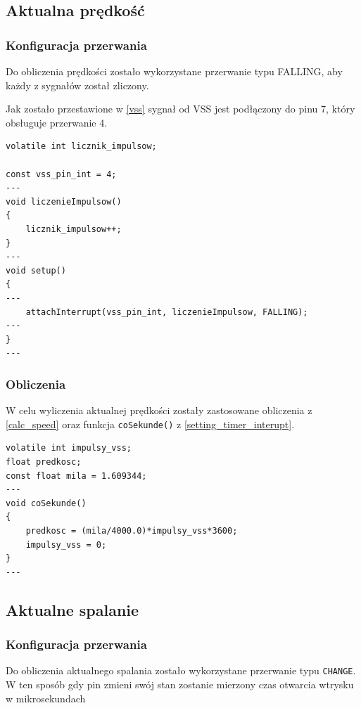 \subsection{Aktualna prędkość}
\subsubsection{Konfiguracja przerwania}

Do obliczenia prędkości zostało wykorzystane przerwanie typu FALLING, aby każdy z sygnałów został zliczony.

Jak zostało przestawione w \ref{vss} sygnał od VSS jest podłączony do pinu 7, który obsługuje przerwanie 4.

\begin{lstlisting}[label=list:vss_int,caption=Ustawianie przerwania VSS,
basicstyle=\footnotesize\ttfamily]
volatile int licznik_impulsow;

const vss_pin_int = 4;
---
void liczenieImpulsow()
{
    licznik_impulsow++;
}
---
void setup()
{
---
    attachInterrupt(vss_pin_int, liczenieImpulsow, FALLING);
---
}
---
\end{lstlisting}
\subsubsection{Obliczenia} \label{code_speed}

W celu wyliczenia aktualnej prędkości zostały zastosowane obliczenia z \ref{calc_speed} oraz funkcja \texttt{coSekunde()} z \ref{setting_timer_interupt}.

\begin{lstlisting}[label=list:vss_int,caption=Wyliczanie aktualnej prędkości,
basicstyle=\footnotesize\ttfamily]
volatile int impulsy_vss;
float predkosc;
const float mila = 1.609344;
---
void coSekunde()
{
    predkosc = (mila/4000.0)*impulsy_vss*3600;
    impulsy_vss = 0;
}
---
\end{lstlisting}

\subsection{Aktualne spalanie}
\subsubsection{Konfiguracja przerwania}

Do obliczenia aktualnego spalania zostało wykorzystane przerwanie typu \texttt{CHANGE}. W ten sposób gdy pin zmieni swój stan zostanie mierzony czas otwarcia wtrysku w mikrosekundach

